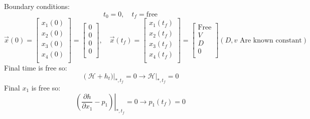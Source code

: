 Boundary conditions:
$$t_0 = 0,\quad t_f = \text{free}$$
$$\vec{x}(0) = \begin{bmatrix}
	x_1(0) \\
	x_2(0) \\
	x_3(0) \\
	x_4(0) \\
\end{bmatrix}= \begin{bmatrix}
	0 \\
	0 \\
	0 \\
	0 \\
\end{bmatrix}, \quad
\vec{x}(t_f) = \begin{bmatrix}
	x_1(t_f) \\
	x_2(t_f) \\
	x_3(t_f) \\
	x_4(t_f) \\
\end{bmatrix}= \begin{bmatrix}
	\text{Free} \\
	V \\
	D \\
	0 \\
\end{bmatrix}
(D, v \text{ Are known constant})$$
Final time is free so:
$$\left(\mathcal{H} + h_t)\right \vert_{*, t_f} = 0 \to \mathcal{H} \vert_{*, t_f} = 0 $$
Final $x_1$ is free so:
\begin{equation}\label{Solvep_1Q2_a}
	\left.(\dfrac{\partial h}{\partial x_1} - p_1) \right \vert_{*, t_f} = 0 \to p_1(t_f) = 0
\end{equation}

